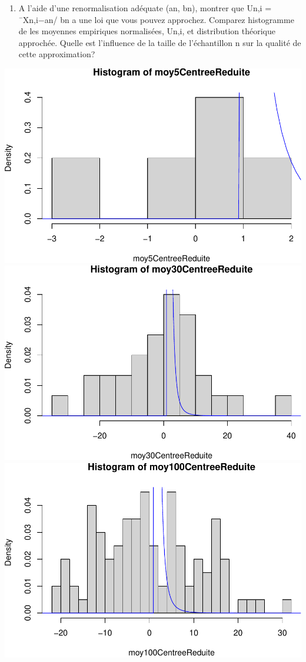 \documentclass[
]{article}
\providecommand{\tightlist}{%
  \setlength{\itemsep}{0pt}\setlength{\parskip}{0pt}}
\begin{document}
\begin{enumerate}
\def\labelenumi{\arabic{enumi}.}
\setcounter{enumi}{3}
\tightlist
\item
  A l'aide d'une renormalisation adéquate (an, bn), montrer que Un,i =
  ¯Xn,i−an/ bn a une loi que vous pouvez approchez. Comparez histogramme
  de les moyennes empiriques normalisées, Un,i, et distribution
  théorique approchée. Quelle est l'influence de la taille de
  l'échantillon n sur la qualité de cette approximation?
\end{enumerate}

\includegraphics{tp2_files/figure-latex/normalisation-1.pdf}
\includegraphics{tp2_files/figure-latex/normalisation-2.pdf}
\includegraphics{tp2_files/figure-latex/normalisation-3.pdf}
\end{document}
